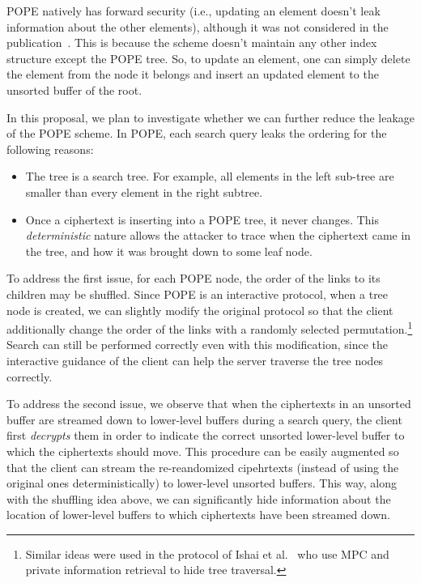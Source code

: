 POPE natively has forward security (i.e., updating an element doesn't leak
information about the other elements), although it was not considered in the
publication~\cite{CCS:RACY16}.  This is because the scheme doesn't maintain any
other index structure except the POPE tree. So, to update an element, one can
simply delete the element from the node it belongs and insert an updated
element to the unsorted buffer of the root. 

In this proposal, we plan to investigate whether we can further reduce the
leakage of the POPE scheme. 
%
In POPE, each search query leaks the ordering  for the following reasons: 
\begin{itemize}\setlength\itemsep{0em}
\item The tree is a search tree. For example, all elements in the
  left sub-tree are smaller than every element in the right subtree.
\item Once a ciphertext is inserting into a POPE tree, it never changes. This {\em
  deterministic} nature allows the attacker to trace when the ciphertext came
  in the tree, and how it was brought down to some leaf node.  
\end{itemize}

To address the first issue, for
each POPE node, the order of the links to its children may be shuffled. Since
POPE is an interactive protocol, when a tree node is created, we can slightly
modify the original protocol so that the client additionally change the order
of the links with a randomly selected permutation.\footnote{Similar ideas were used in the protocol of Ishai et al.~\cite{RSA:IKLO16} who use MPC and private information retrieval to hide tree traversal.}
%
Search can still be performed correctly even with this
modification, since the interactive guidance of the client can help the server
traverse the tree nodes correctly. 

To address the second issue, we observe that when the ciphertexts in an
unsorted buffer are streamed down to lower-level buffers during a search query,
the client first {\em decrypts} them in order to indicate the correct unsorted
lower-level buffer to which the ciphertexts should move. This procedure can be
easily augmented so that the client can stream the {re-reandomized cipehrtexts}
(instead of using the original ones deterministically) to lower-level unsorted
buffers. This way, along with the shuffling idea above, we can significantly
hide information about the location of lower-level buffers to which ciphertexts
have been streamed down. 

